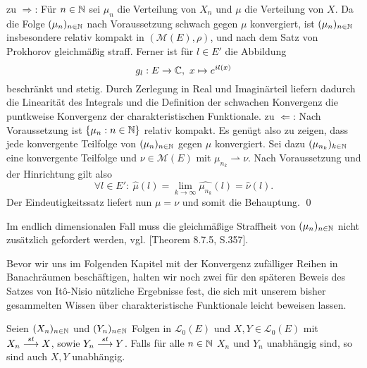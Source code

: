 \begin{proof*}
    zu $\Rightarrow$: Für $n \in \mathbb{N}$ sei $\mu_n$ die Verteilung von $X_n$ und $\mu$ die Verteilung von $X$. Da die Folge $(\mu_n)_{n \in \mathbb{N}}$ nach Voraussetzung schwach gegen $\mu$ konvergiert, 
    ist $(\mu_n)_{n \in  \mathbb{N}}$ insbesondere relativ kompakt in $(\mathcal{M}(E), \rho)$, und nach dem Satz von Prokhorov gleichmäßig straff. 
    Ferner ist für $l \in E'$ die Abbildung 
    $$
        g_l: E \to \mathbb{C},  \ x \mapsto e^{il(x)}
    $$ 
    beschränkt und stetig. Durch Zerlegung in Real und Imaginärteil liefern dadurch die Linearität des Integrals und die Definition der schwachen Konvergenz die puntkweise Konvergenz der charakteristischen Funktionale. 
    \newline 
    zu $\Leftarrow$: Nach Voraussetzung ist  $\{\mu_n : n \in \mathbb{N}\}$ relativ kompakt. Es genügt also zu zeigen, dass jede konvergente Teilfolge von $(\mu_n)_{n \in \mathbb{N}}$ gegen $\mu$ konvergiert. 
    Sei dazu $(\mu_{n_k})_{k \in \mathbb{N}}$ eine konvergente Teilfolge und $\nu \in \mathcal{M}(E)$ mit $\mu_{n_k} \rightharpoonup \nu$. Nach Voraussetzung und der Hinrichtung gilt also 
    $$
        \forall l \in E': \ \widehat{\mu}(l) = \lim_{k \to \infty} \widehat{\mu_{n_k}}(l) = \widehat{\nu}(l).
    $$
    Der Eindeutigkeitssatz liefert nun $\mu = \nu$ und somit die Behauptung. \qed
\end{proof*}

\begin{remark}
    Im endlich dimensionalen Fall muss die gleichmäßige Straffheit von $(\mu_n)_{n \in \mathbb{N}}$ nicht zusätzlich gefordert werden, vgl. \cite{gs}[Theorem 8.7.5, S.357]. 
\end{remark}

Bevor wir uns im Folgenden Kapitel mit der Konvergenz zufälliger Reihen in Banachräumen beschäftigen, halten wir noch zwei für den späteren Beweis des Satzes von Itô-Nisio nützliche Ergebnisse fest, die sich mit unserem bisher gesammelten Wissen über charakteristische Funktionale leicht beweisen lassen.  

\begin{proposition}
    Seien $(X_n)_{n \in \mathbb{N}}$ und $(Y_n)_{n \in \mathbb{N}}$ Folgen in $\mathcal{L}_0(E)$ und $X,Y \in \mathcal{L}_0(E)$ mit $X_n \overset{st}{\longrightarrow} X$, sowie $Y_n \overset{st}{\longrightarrow} Y$. 
    Falls für alle $n \in \mathbb{N}$ $X_n$ und $Y_n$ unabhängig sind, so sind auch $X,Y$ unabhängig. 
\end{proposition}

